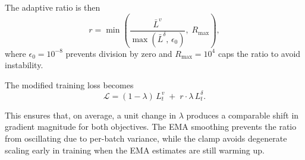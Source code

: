 \documentclass[acmtog]{acmart}
\newcommand{\orz}[1]{\textcolor{red}{$_{OR}$[#1]}}
\begin{document}
The adaptive ratio is then
\begin{equation}
r = \min\!\left(\frac{\bar{L}^{v}}{\max(\bar{L}^{\delta},\, \epsilon_0)},\; R_{\max}\right),
\end{equation}
where $\epsilon_0 = 10^{-8}$ prevents division by zero and $R_{\max} = 10^{4}$ caps the ratio to avoid instability.

The modified training loss becomes
\begin{equation}
\mathcal{L} = (1-\lambda)\, L_t^{v} \;+\; r \cdot \lambda\, L_t^{\delta}.
\label{eq:adaptive_loss}
\end{equation}

This ensures that, on average, a unit change in $\lambda$ produces a comparable shift in gradient magnitude for both objectives. The EMA smoothing prevents the ratio from oscillating due to per-batch variance, while the clamp avoids degenerate scaling early in training when the EMA estimates are still warming up.

\newcommand{\eqline}[1]{\makebox[\linewidth][l]{$#1$}}
\newcommand{\eqscale}{0.85}







\end{document}
